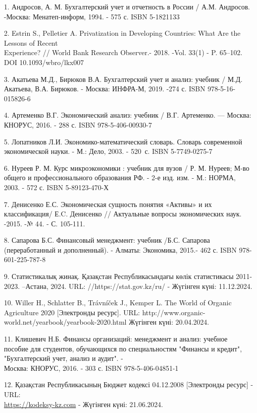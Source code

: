 \begin{references}
1. Андросов, А. М. Бухгалтерский учет и отчетность в России / А.М.
Андросов. -Москва: Менатеп-информ, 1994. - 575 с. ISBN 5-1821133

2. Estrin S., Pelletier A. Privatization in Developing
Countries: What Are the Lessons of Recent \\Experience? // World Bank
Research Observer.- 2018. -Vol. 33(1) - P. 65--102.
DOI 10.1093/wbro/lkx007

3. Акатьева М.Д., Бирюков В.А. Бухгалтерский учет и анализ: учебник /
М.Д. Акатьева, В.А. Бирюков. - Москва: ИНФРА-М, 2019. -274 с. ISBN
978-5-16-015826-6

4. Артеменко В.Г. Экономический анализ: учебник / В.Г. Артеменко. ---
Москва: КНОРУС, 2016. - 288 с. ISBN 978-5-406-00930-7

5. Лопатников Л.И. Экономико-математический словарь. Словарь современной
экономической науки. - М.: Дело, 2003. - 520~с. ISBN 5-7749-0275-7

6. Нуреев Р. М. Курс микроэкономики : учебник для вузов / Р. М. Нуреев;
М-во общего и профессионального образования РФ. - 2-е изд. изм. - М.:
НОРМА, 2003. - 572 с. ISBN 5-89123-470-Х

7. Денисенко Е.С. Экономическая сущность понятия «Активы» и их
классификация/ Е.C. Денисенко // Актуальные вопросы экономических
наук. -2015. -№ 44. - С. 105-111.

8. Сапарова Б.С. Финансовый менеджмент: учебник /Б.С. Сапарова
(переработанный и дополненный). - Алматы: Экономика, 2015.- 462 с.
ISBN 978-601-225-787-8

9. Статистикалық жинақ. Қазақстан Республикасындағы көлік статистикасы
2011-2023. --Астана, 2024. URL: //https://stat.gov.kz/ru/ - Жүгінген
күні: 11.12.2024.

10. Willer H., Schlatter B., Trávníček J., Kemper L. The World of Organic
Agriculture 2020 {[}Электронды ресурс{]}. URL:
http://www.organic-world.net/yearbook/yearbook-2020.html Жүгінген
күні: 20.04.2024.

11. Клишевич Н.Б. Финансы организаций: менеджмент и анализ: учебное
пособие для студентов, обучающихся по специальностям "Финансы и
кредит", "Бухгалтерский учет, анализ и аудит". - \\Москва: КНОРУС, 2016.
- 303 с. ISBN 978-5-406-04851-1

12. Қазақстан Республикасының Бюджет кодексі 04.12.2008 {[}Электронды
ресурс{]} - URL:\\
\href{https://kodeksy-kz.com/ka/dictionary/b/byudzhetnye_sredstva}{https://kodeksy-kz.com} -
Жүгінген күні: 21.06.2024.


\end{references}
